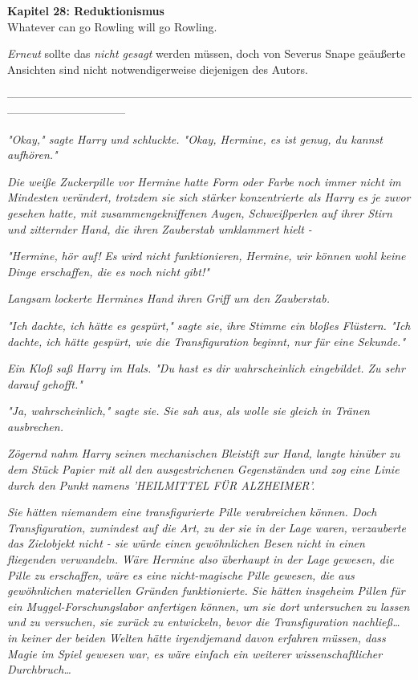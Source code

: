 

\hypertarget{reduktionismus}{%

\textbf{Kapitel 28: Reduktionismus}\\

Whatever can go Rowling will go Rowling.

\emph{Erneut} sollte das \emph{nicht gesagt} werden müssen, doch von Severus Snape geäußerte Ansichten sind nicht notwendigerweise diejenigen des Autors.

--------------------------------------------------------------------------------------------------------------------------------------------

\emph{"Okay," sagte Harry und schluckte. "Okay, Hermine, es ist genug, du kannst aufhören."}

\emph{Die weiße Zuckerpille vor Hermine hatte Form oder Farbe noch immer nicht im Mindesten verändert, trotzdem sie sich stärker konzentrierte als Harry es je zuvor gesehen hatte, mit zusammengekniffenen Augen, Schweißperlen auf ihrer Stirn und zitternder Hand, die ihren Zauberstab umklammert hielt -}

\emph{"Hermine,} \emph{\emph{hör auf!}} \emph{Es wird nicht funktionieren, Hermine, wir können wohl keine Dinge erschaffen, die es noch nicht gibt!"}

\emph{Langsam lockerte Hermines Hand ihren Griff um den Zauberstab.}

\emph{"Ich dachte, ich hätte es gespürt," sagte sie, ihre Stimme ein bloßes Flüstern. "Ich dachte, ich hätte gespürt, wie die Transfiguration beginnt, nur für eine Sekunde."}

\emph{Ein Kloß saß Harry im Hals. "Du hast es dir wahrscheinlich eingebildet. Zu sehr darauf gehofft."}

\emph{"Ja, wahrscheinlich," sagte sie. Sie sah aus, als wolle sie gleich in Tränen ausbrechen.}

\emph{Zögernd nahm Harry seinen mechanischen Bleistift zur Hand, langte hinüber zu dem Stück Papier mit all den ausgestrichenen Gegenständen} \emph{und zog eine Linie durch den} \emph{Punkt} \emph{namens 'HEILMITTEL FÜR ALZHEIMER'.}

\emph{Sie hätten niemandem eine transfigurierte Pille verabreichen können. Doch Transfiguration, zumindest auf die Art, zu der sie in der Lage waren,} \emph{verzauberte das Zielobjekt nicht - sie würde einen gewöhnlichen Besen nicht in einen fliegenden verwandeln. Wäre Hermine also überhaupt in der Lage gewesen, die Pille zu erschaffen, wäre es eine} \emph{\emph{nicht-magische}} \emph{Pille gewesen, die aus gewöhnlichen materiellen Gründen funktionierte. Sie hätten insgeheim Pillen für ein Muggel-Forschungslabor anfertigen können, um sie dort} \emph{\emph{untersuchen}} \emph{zu lassen und zu versuchen, sie zurück zu entwickeln, bevor die Transfiguration nachließ… in keiner der beiden Welten hätte irgendjemand davon erfahren müssen, dass Magie im Spiel gewesen war, es wäre einfach ein weiterer wissenschaftlicher Durchbruch…}

}
